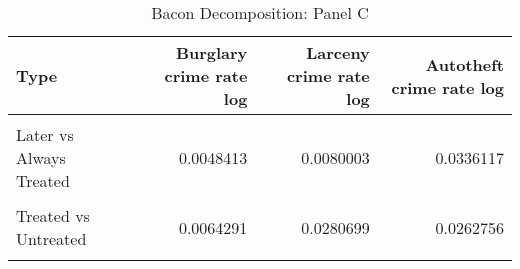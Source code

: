\begin{table}[H]

\caption{\label{tab:tab:bacondecompositionc}Bacon Decomposition: Panel C}
\centering
\begin{tabular}[t]{lrrr}
\toprule
Type & Burglary crime rate log & Larceny crime rate log & Autotheft crime rate log\\
\midrule
\cellcolor{gray!6}{Earlier vs Later Treated} & \cellcolor{gray!6}{-0.0023226} & \cellcolor{gray!6}{-0.0004160} & \cellcolor{gray!6}{0.0056843}\\
Later vs Always Treated & 0.0048413 & 0.0080003 & 0.0336117\\
\cellcolor{gray!6}{Later vs Earlier Treated} & \cellcolor{gray!6}{-0.0013013} & \cellcolor{gray!6}{0.0004859} & \cellcolor{gray!6}{0.0020305}\\
Treated vs Untreated & 0.0064291 & 0.0280699 & 0.0262756\\
\cellcolor{gray!6}{Total TWFE} & \cellcolor{gray!6}{0.0076465} & \cellcolor{gray!6}{0.0361400} & \cellcolor{gray!6}{0.0676020}\\
\bottomrule
\end{tabular}
\end{table}
